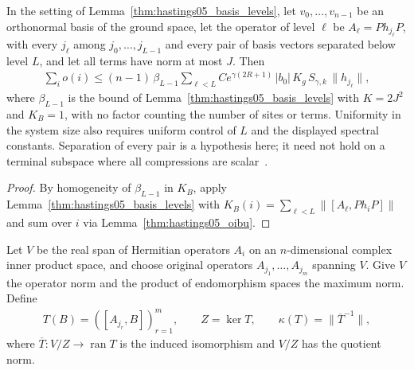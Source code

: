 \begin{lemma}
    \label{thm:hastings05_oibu_levels}
    \leanok
    In the setting of Lemma~\ref{thm:hastings05_basis_levels}, let $v_0,\dots,v_{n-1}$
    be an orthonormal basis of the ground space, let the operator of level
    $\ell$ be $A_\ell=Ph_{j_\ell}P$, with every $j_\ell$ among
    $j_0,\dots,j_{L-1}$ and every pair of basis vectors separated below level
    $L$, and let all terms have norm at most $J$. Then
    \begin{align}
        \sum_io(i)\le(n-1)\,\beta_{L-1}\sum_{\ell<L}Ce^{\gamma(2R+1)}\,|b_0|\,K_g\,
        S_{\gamma,k}\,\|h_{j_\ell}\|,
        \label{eq:hastings05_oibu_levels}
    \end{align}
    where $\beta_{L-1}$ is the bound of
    Lemma~\ref{thm:hastings05_basis_levels} with $K=2J^2$ and $K_B=1$,
    with no factor counting the number of sites or terms. Uniformity in the system
    size also requires uniform control of $L$ and the displayed spectral constants.
    Separation of every pair is a hypothesis here; it need not hold on a terminal
    subspace where all compressions are scalar~\cite{gap:hastings05_two_dim_ground_basis}.
\end{lemma}
\begin{proof}\leanok
    By homogeneity of $\beta_{L-1}$ in $K_B$, apply
    Lemma~\ref{thm:hastings05_basis_levels} with
    $K_B(i)=\sum_{\ell<L}\|[A_\ell,Ph_iP]\|$ and sum over $i$ via
    Lemma~\ref{thm:hastings05_oibu}.
\end{proof}


\begin{definition}
    \label{def:hastings05_commutator_conditioning}
    \leanok
    Let $V$ be the real span of Hermitian operators $A_i$ on an
    $n$-dimensional complex inner product space, and choose original operators
    $A_{j_1},\dots,A_{j_m}$ spanning $V$. Give $V$ the operator norm and the
    product of endomorphism spaces the maximum norm. Define
    \begin{align*}
        T(B)=([A_{j_r},B])_{r=1}^m,
        \qquad Z=\ker T,
        \qquad \kappa(T)=\|\overline T^{-1}\|,
    \end{align*}
    where $\overline T:V/Z\longrightarrow\operatorname{ran}T$ is the induced
    isomorphism and $V/Z$ has the quotient norm.
\end{definition}

